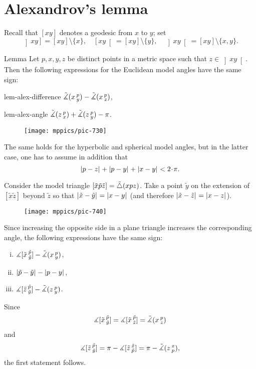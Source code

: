 \section{Alexandrov's lemma}

Recall that $[xy]$ denotes a geodesic from $x$ to $y$;
set  
\[
\left]x y\right]=[xy]\setminus\{x\},
\quad
\left[x y\right[=[xy]\setminus\{y\},
\quad
\left]x y\right[=[xy]\setminus\{x,y\}.\]

\begin{thm}{Lemma}
\label{lem:alex}  
Let $p,x,y,z$ be distinct points in a metric space such that $z\in \left]x y\right[$.
Then 
the following expressions for the Euclidean model angles have the same sign:

\begin{subthm}{lem-alex-difference}
$\tilde\measuredangle(x\,{}^{p}_{y})
-\tilde\measuredangle(x\,{}^{p}_{z})$,
\end{subthm} 

\begin{subthm}{lem-alex-angle}
$\tilde\measuredangle(z\,{}^{p}_{x})
+\tilde\measuredangle(z\,{}^{p}_{y}) -\pi$.
\end{subthm}

\begin{wrapfigure}{r}{25mm}
\vskip-6mm
\centering
\texttt{[image: mppics/pic-730]}
\end{wrapfigure}

The same holds for the hyperbolic and spherical model angles, 
but in the latter case, one has to assume in addition that
\[\dist{p}{z}{}+\dist{p}{y}{}+\dist{x}{y}{}< 2\cdot\pi.\]

\end{thm}


Consider the model triangle $[\tilde x\tilde p\tilde z]=\tilde\triangle(x p z)$.
Take 
a point $\tilde y$ on the extension of 
$[\tilde x \tilde z]$ beyond $\tilde z$ so that $\dist{\tilde x}{\tilde y}{}=\dist{x}{y}{}$ (and therefore $\dist{\tilde x}{\tilde z}{}=\dist{x}{z}{}$). 

\begin{wrapfigure}{r}{33mm}
\vskip-0mm
\centering
\texttt{[image: mppics/pic-740]}
\end{wrapfigure}

Since increasing the opposite side in a plane triangle increases the corresponding angle, 
the following expressions have the same sign:
\begin{enumerate}[(i)]
\item $\measuredangle[\tilde x\,{}^{\tilde p}_{\tilde y}]-\tilde\measuredangle(x\,{}^{p}_{y})$,
\item $\dist{\tilde p}{\tilde y}{}-\dist{p}{y}{}$,
\item $\measuredangle[\tilde z\,{}^{\tilde p}_{\tilde y}]-\tilde\measuredangle(z\,{}^{p}_{y})$.
\end{enumerate}
Since 
\[\measuredangle[\tilde x\,{}^{\tilde p}_{\tilde y}]=\measuredangle[\tilde x\,{}^{\tilde p}_{\tilde z}]=\tilde\measuredangle(x\,{}^{p}_{z})\]
and
\[ \measuredangle[\tilde z\,{}^{\tilde p}_{\tilde y}]
=\pi-\measuredangle[\tilde z\,{}^{\tilde x}_{\tilde p}]
=\pi-\tilde\measuredangle(z\,{}^{x}_{p}),\]
the first statement follows.
\qeds

